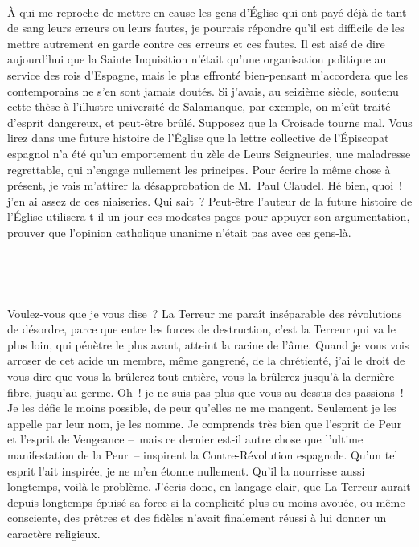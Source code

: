 \documentclass[french,twoside]{book} %
\newcommand{\astertri}{\medskip\par\centerline{\color{rubric}\large\selectfont{\syms ✻\,✻\,✻}}\medskip\par}%
\begin{document}
\noindent  \par
À qui me reproche de mettre en cause les gens d’Église qui ont payé déjà de tant de sang leurs erreurs ou leurs fautes, je pourrais répondre qu’il est difficile de les mettre autrement en garde contre ces erreurs et ces fautes. Il est aisé de dire aujourd’hui que la Sainte Inquisition n’était qu’une organisation politique au service des rois d’Espagne, mais le plus effronté bien-pensant m’accordera que les contemporains ne s’en sont jamais doutés. Si j’avais, au seizième siècle, soutenu cette thèse à l’illustre université de Salamanque, par exemple, on m’eût traité d’esprit dangereux, et peut-être brûlé. Supposez que la Croisade tourne mal. Vous lirez dans une future histoire de l’Église que la lettre collective de l’Épiscopat espagnol n’a été qu’un emportement du zèle de Leurs Seigneuries, une maladresse regrettable, qui n’engage nullement les principes. Pour écrire la même chose à présent, je vais m’attirer la désapprobation de M. Paul Claudel. Hé bien, quoi ! j’en ai assez de ces niaiseries. Qui sait ? Peut-être l’auteur de la future histoire de l’Église utilisera-t-il un jour ces modestes pages pour appuyer son argumentation, prouver que l’opinion catholique unanime n’était pas avec ces gens-là.\par
 \par

\astertri

\noindent  \par
Voulez-vous que je vous dise ? La Terreur me paraît inséparable des révolutions de désordre, parce que entre les forces de destruction, c’est la Terreur qui va le plus loin, qui pénètre le plus avant, atteint la racine de l’âme. Quand je vous vois arroser de cet acide un membre, même gangrené, de la chrétienté, j’ai le droit de vous dire que vous la brûlerez tout entière, vous la brûlerez jusqu’à la dernière fibre, jusqu’au germe. Oh ! je ne suis pas plus que vous au-dessus des passions ! Je les défie le moins possible, de peur qu’elles ne me mangent. Seulement je les appelle par leur nom, je les nomme. Je comprends très bien que l’esprit de Peur et l’esprit de Vengeance – mais ce dernier est-il autre chose que l’ultime manifestation de la Peur – inspirent la Contre-Révolution espagnole. Qu’un tel esprit l’ait inspirée, je ne m’en étonne nullement. Qu’il la nourrisse aussi longtemps, voilà le problème. J’écris donc, en langage clair, que La Terreur aurait depuis longtemps épuisé sa force si la complicité plus ou moins avouée, ou même consciente, des prêtres et des fidèles n’avait finalement réussi à lui donner un caractère religieux.\par
 \par
\end{document}

